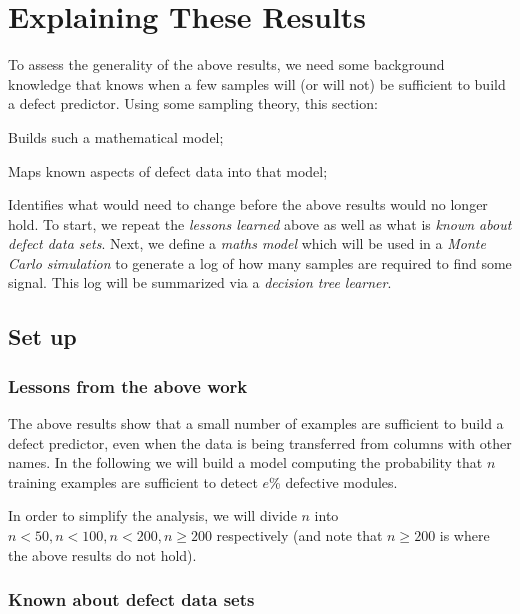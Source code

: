 

%

\newcommand{\tion}[1]{\S\ref{sect:#1}}
\newcommand{\eq}[1]{Equation~\ref{eq:#1}}

\section{Explaining These Results}\label{sect:xplain}
To assess the generality of the above results, we need some background knowledge that knows when a few samples will (or will not)
be sufficient to build a defect predictor. Using some sampling theory, this section:
\bi
\item
Builds such a mathematical model;
\item Maps known aspects
of defect data  into that model;
\item Identifies what would need to change before the above results would no longer hold.
\ei
To start, we repeat the {\em lessons learned} above as well as what is {\em known about defect data sets}.
Next, we define a {\em maths model} which will be used in a {\em Monte Carlo simulation} to generate a log of how many samples are required
to find some signal. This log will be summarized via a {\em decision tree learner}.

\subsection{Set up}
\subsubsection{ Lessons from the above work}

The above results show
that a small number
of examples are sufficient to build a defect predictor, even when the data is being transferred from columns with other names.
In the following we will build a model computing the probability that $n$ training examples are sufficient to detect $e$\% defective modules.

In order to simplify the analysis, we will divide $n$ into
  $n<50, n<100, n<200,n\ge 200$ respectively (and note that $n  \ge 200$ is where the above
  results do not hold).

\subsubsection{Known about defect data sets}\label{sect:data}

